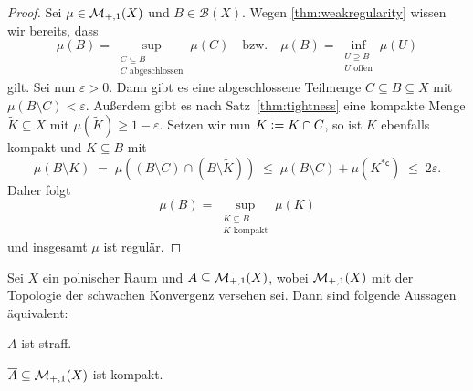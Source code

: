 \documentclass[../main/main.tex]{subfiles}
\begin{document}
	\begin{proof}
		Sei $\mu \in \mathcal{M}_{+,1}(X)$ und $B \in \mathcal{B}(X)$. 
		Wegen \ref{thm:weakregularity} wissen wir bereits, dass 
		\[\mu(B) = \sup_{\substack{C \subseteq B \\ C \text{ abgeschlossen}}} \mu(C) 
		\quad \text{bzw.} \quad \mu(B) = \inf_{\substack{U \supseteq B \\ U \text{ offen}}} 
		\mu(U)\]
		gilt. Sei nun $\varepsilon > 0$. Dann gibt es eine abgeschlossene Teilmenge 
		$C \subseteq B \subseteq X$ mit $\mu(B \setminus C) < \varepsilon$. 
		Außerdem gibt es nach Satz~\ref{thm:tightness} eine kompakte Menge 
		$\tilde{K} \subseteq X$ mit $\mu(\tilde{K}) \geq 1 - \varepsilon$. Setzen 
		wir nun $K \vcentcolon = \tilde{K} \cap C$, so ist $K$ ebenfalls kompakt und 
		$K \subseteq B$ mit 
		\[ \mu(B \setminus K) 
		\; = \; \mu((B \setminus C) \cap (B \setminus \tilde{K})) 
		\; \leq \; \mu(B \setminus C) + \mu(K^{\ast \mathsf{c}}) 
		\; \leq \; 2 \varepsilon \text{.} \]
		Daher folgt 
		\[\mu(B) 
		= \sup_{\substack{K \subseteq B \\ K \text{ kompakt}}} \mu(K)\] 
		und insgesamt $\mu$ ist regulär.
	\end{proof}
	
	\begin{Satz}[Prokhorov]
		\label{thm:prokhorov}
		Sei $X$ ein polnischer Raum und $A \subseteq \mathcal{M}_{+,1}(X)$, wobei $\mathcal{M}_{+,1}(X)$ mit der 
		Topologie der schwachen Konvergenz versehen sei. Dann sind folgende Aussagen äquivalent:
		\begin{equivalentthm}
			\item $A$ ist straff.
			\item $\overline{A} \subseteq \mathcal{M}_{+,1}(X)$ ist kompakt.
		\end{equivalentthm}
	\end{Satz}
	
\end{document}
